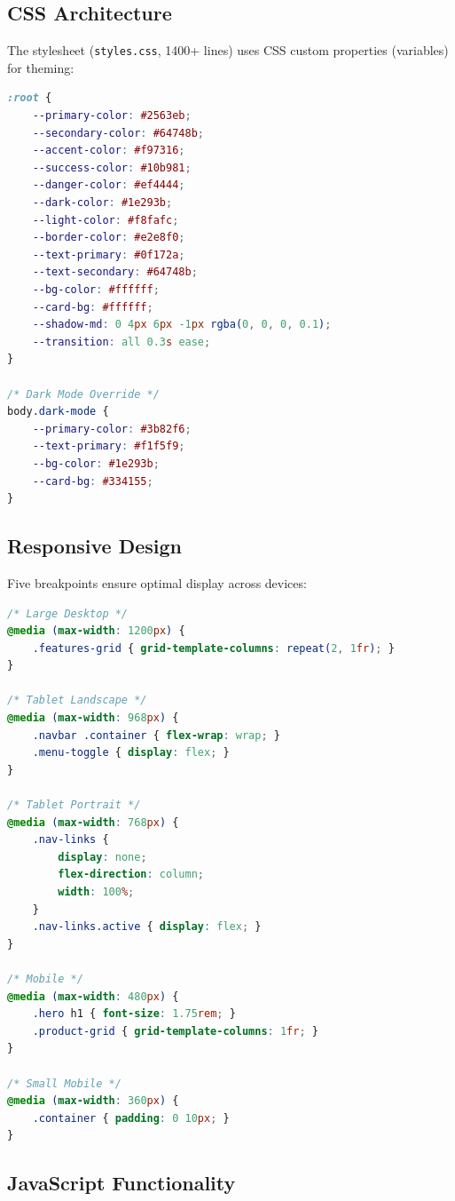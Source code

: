 \documentclass[12pt,a4paper]{article}
\begin{document}
\subsection{CSS Architecture}

The stylesheet (\texttt{styles.css}, 1400+ lines) uses CSS custom properties (variables) for theming:

\begin{lstlisting}[language=CSS, caption=CSS Variables for Theming]
:root {
    --primary-color: #2563eb;
    --secondary-color: #64748b;
    --accent-color: #f97316;
    --success-color: #10b981;
    --danger-color: #ef4444;
    --dark-color: #1e293b;
    --light-color: #f8fafc;
    --border-color: #e2e8f0;
    --text-primary: #0f172a;
    --text-secondary: #64748b;
    --bg-color: #ffffff;
    --card-bg: #ffffff;
    --shadow-md: 0 4px 6px -1px rgba(0, 0, 0, 0.1);
    --transition: all 0.3s ease;
}

/* Dark Mode Override */
body.dark-mode {
    --primary-color: #3b82f6;
    --text-primary: #f1f5f9;
    --bg-color: #1e293b;
    --card-bg: #334155;
}
\end{lstlisting}

\subsection{Responsive Design}

Five breakpoints ensure optimal display across devices:

\begin{lstlisting}[language=CSS, caption=Responsive Breakpoints]
/* Large Desktop */
@media (max-width: 1200px) {
    .features-grid { grid-template-columns: repeat(2, 1fr); }
}

/* Tablet Landscape */
@media (max-width: 968px) {
    .navbar .container { flex-wrap: wrap; }
    .menu-toggle { display: flex; }
}

/* Tablet Portrait */
@media (max-width: 768px) {
    .nav-links {
        display: none;
        flex-direction: column;
        width: 100%;
    }
    .nav-links.active { display: flex; }
}

/* Mobile */
@media (max-width: 480px) {
    .hero h1 { font-size: 1.75rem; }
    .product-grid { grid-template-columns: 1fr; }
}

/* Small Mobile */
@media (max-width: 360px) {
    .container { padding: 0 10px; }
}
\end{lstlisting}

\subsection{JavaScript Functionality}
\end{document}
